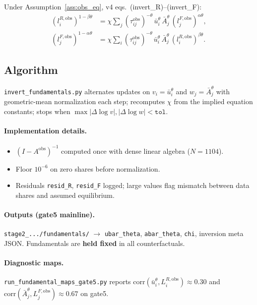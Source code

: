 \documentclass[11pt]{article}
\newcommand{\ubar}{\bar u}
\newcommand{\Abar}{\bar A}
\newcommand{\obs}{\mathrm{obs}}
\begin{document}
Under Assumption~\ref{ass:obs_eq}, v4 eqs.\ (invert\_R)--(invert\_F):
\begin{align}
  (l_i^{R,\obs})^{1-\beta\theta}
  &= \chi\sum_j (\tau^{\obs}_{ij})^{-\theta}\,
     \ubar_i^{\theta}\,\Abar_j^{\theta}\,(l_j^{F,\obs})^{\alpha\theta},
  \label{eq:invert_R}\\
  (l_j^{F,\obs})^{1-\alpha\theta}
  &= \chi\sum_i (\tau^{\obs}_{ij})^{-\theta}\,
     \ubar_i^{\theta}\,\Abar_j^{\theta}\,(l_i^{R,\obs})^{\beta\theta}.
  \label{eq:invert_F}
\end{align}

\subsection{Algorithm}

\texttt{invert\_fundamentals.py} alternates updates on
$v_i=\ubar_i^{\theta}$ and $w_j=\Abar_j^{\theta}$ with geometric-mean
normalization each step; recomputes $\chi$ from the implied equation
constants; stops when $\max|\Delta\log v|,|\Delta\log w|<\texttt{tol}$.

\paragraph{Implementation details.}
\begin{itemize}[leftmargin=2em]
  \item $(I-A^{\obs})^{-1}$ computed once with dense linear algebra
        ($N=1104$).
  \item Floor $10^{-6}$ on zero shares before normalization.
  \item Residuals \texttt{resid\_R}, \texttt{resid\_F} logged; large
        values flag mismatch between data shares and assumed equilibrium.
\end{itemize}

\paragraph{Outputs (gate5 mainline).}
\texttt{stage2\_.../fundamentals/} $\rightarrow$
\texttt{ubar\_theta}, \texttt{abar\_theta}, \texttt{chi}, inversion
meta JSON.  Fundamentals are \textbf{held fixed} in all counterfactuals.

\paragraph{Diagnostic maps.}
\texttt{run\_fundamental\_maps\_gate5.py} reports
$\mathrm{corr}(\ubar_i^{\theta},L_i^{R,\obs})\approx 0.30$ and
$\mathrm{corr}(\Abar_j^{\theta},L_j^{F,\obs})\approx 0.67$ on gate5.
\end{document}
